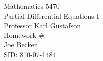 \begin{titlepage}
\setlength{\topmargin}{1.5in}
\begin{center}
\Huge{Mathematics 5470} \\
\LARGE{Partial Differential Equations I} \\
\Large{Professor Karl Gustafson} \\[1cm]

\huge{Homework \#\HWnum}\\[0.5cm]

\large{Joe Becker} \\
\large{SID: 810-07-1484} \\
\large{\due} 

\end{center}

\end{titlepage}

